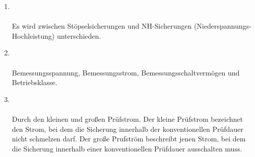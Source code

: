 \begin{enumerate}
    \item   {} \\\\
            Es wird zwischen Stöpselsicherungen und NH-Sicherungen (Niederspannungs-Hochleistung) unterschieden.

    \item   {} \\\\
            Bemessungsspannung, Bemessungsstrom, Bemessungsschaltvermögen und Betriebsklasse.

    \item   {} \\\\
            Durch den kleinen und großen Prüfstrom. Der kleine Prüfstrom bezeichnet den Strom, bei dem die Sicherung innerhalb der konventionellen Prüfdauer nicht schmelzen darf.
            Der große Prufström beschreibt jenen Strom, bei dem die Sicherung innerhalb einer konventionellen Prüfdauer ausschalten muss.


\end{enumerate}
